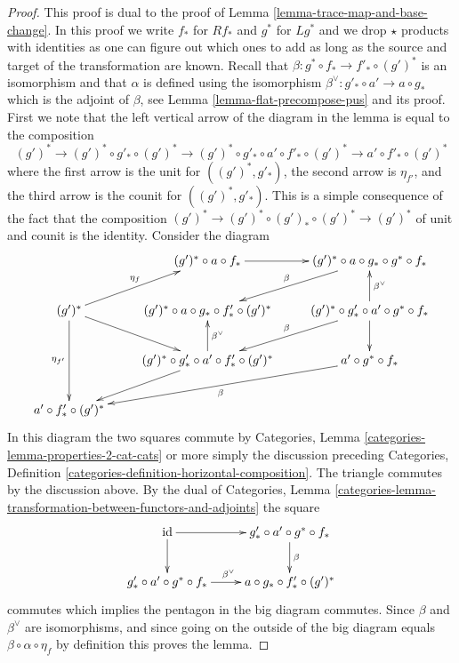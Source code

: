 \begin{proof}
This proof is dual to the proof of Lemma \ref{lemma-trace-map-and-base-change}.
In this proof we write $f_*$ for $Rf_*$ and $g^*$ for $Lg^*$ and we
drop $\star$ products with identities as one can figure out which ones
to add as long as the source and target of the transformation are known.
Recall that $\beta : g^* \circ f_* \to f'_* \circ (g')^*$ is an isomorphism
and that $\alpha$ is defined using
the isomorphism $\beta^\vee : g'_* \circ a' \to a \circ g_*$
which is the adjoint of $\beta$, see Lemma \ref{lemma-flat-precompose-pus}
and its proof. First we note that the left vertical arrow
of the diagram in the lemma is equal to the composition
$$
(g')^* \to (g')^* \circ g'_* \circ (g')^* \to
(g')^* \circ g'_* \circ a' \circ f'_* \circ (g')^* \to
a' \circ f'_* \circ (g')^*
$$
where the first arrow is the unit for $((g')^*, g'_*)$, the second arrow
is $\eta_{f'}$, and the third arrow is the counit for $((g')^*, g'_*)$.
This is a simple consequence of the fact that the composition
$(g')^* \to (g')^* \circ (g')_* \circ (g')^* \to (g')^*$
of unit and counit is the identity. Consider the diagram
$$
\xymatrix{
& (g')^* \circ a \circ f_* \ar[r] &
(g')^* \circ a \circ g_* \circ g^* \circ f_*
\ar[ld]_\beta \\
(g')^* \ar[ru]^{\eta_f} \ar[dd]_{\eta_{f'}} \ar[rd] &
(g')^* \circ a \circ g_* \circ f'_* \circ (g')^* &
(g')^* \circ g'_* \circ a' \circ g^* \circ f_*
\ar[u]_{\beta^\vee} \ar[ld]_\beta \ar[d] \\
& (g')^* \circ g'_* \circ a' \circ f'_* \circ (g')^*
\ar[ld] \ar[u]_{\beta^\vee} &
a' \circ g^* \circ f_* \ar[lld]^\beta \\
a' \circ f'_* \circ (g')^*
}
$$
In this diagram the two squares commute by 
Categories, Lemma \ref{categories-lemma-properties-2-cat-cats}
or more simply the discussion preceding
Categories, Definition \ref{categories-definition-horizontal-composition}.
The triangle commutes by the discussion above. By the dual of
Categories, Lemma
\ref{categories-lemma-transformation-between-functors-and-adjoints}
the square
$$
\xymatrix{
\text{id} \ar[r] \ar[d] &
g'_* \circ a' \circ g^* \circ f_* \ar[d]^\beta \\
g'_* \circ a' \circ g^* \circ f_* \ar[r]^{\beta^\vee} &
a \circ g_* \circ f'_* \circ (g')^*
}
$$
commutes which implies the pentagon in the big diagram commutes.
Since $\beta$ and $\beta^\vee$ are isomorphisms, and since going on
the outside of the big diagram equals
$\beta \circ \alpha \circ \eta_f$ by definition this proves the lemma.
\end{proof}





